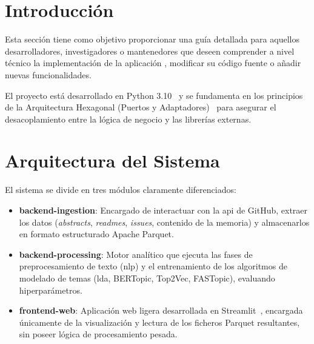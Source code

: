 
\section{Introducción}
Esta sección tiene como objetivo proporcionar una guía detallada para aquellos
desarrolladores, investigadores o mantenedores que deseen comprender a nivel
técnico la implementación de la aplicación \nombreProyecto, modificar su código
fuente o añadir nuevas funcionalidades.

El proyecto está desarrollado en Python 3.10~\cite{31019Documentation} y se
fundamenta en los principios de la Arquitectura Hexagonal (Puertos y
Adaptadores)~\cite{HexagonalArchitectureClean2022} para asegurar el
desacoplamiento entre la lógica de negocio y las librerías externas.


\section{Arquitectura del Sistema}
El sistema se divide en tres módulos claramente diferenciados:
\begin{itemize}
    \item \textbf{backend-ingestion}: Encargado de interactuar con la \acrshort{api} de GitHub, extraer los datos (\textit{abstracts}, \textit{readmes}, \textit{issues}, contenido de la memoria) y almacenarlos en formato estructurado Apache Parquet.
    \item \textbf{backend-processing}: Motor analítico que ejecuta las fases de preprocesamiento de texto (\acrshort{nlp}) y el entrenamiento de los algoritmos de modelado de temas (\acrshort{lda}, BERTopic, Top2Vec, FASTopic), evaluando hiperparámetros.
    \item \textbf{frontend-web}: Aplicación web ligera desarrollada en Streamlit~\cite{StreamlitDocsa}, encargada únicamente de la visualización y lectura de los ficheros Parquet resultantes, sin poseer lógica de procesamiento pesada.
\end{itemize}



